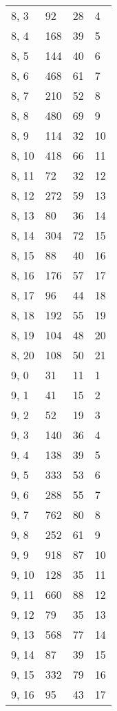 \begin{table}
\begin{tabular}{llll}
8, 3   &      92 &   28 &     4 \\
8, 4   &     168 &   39 &     5 \\
8, 5   &     144 &   40 &     6 \\
8, 6   &     468 &   61 &     7 \\
8, 7   &     210 &   52 &     8 \\
8, 8   &     480 &   69 &     9 \\
8, 9   &     114 &   32 &    10 \\
8, 10  &     418 &   66 &    11 \\
8, 11  &      72 &   32 &    12 \\
8, 12  &     272 &   59 &    13 \\
8, 13  &      80 &   36 &    14 \\
8, 14  &     304 &   72 &    15 \\
8, 15  &      88 &   40 &    16 \\
8, 16  &     176 &   57 &    17 \\
8, 17  &      96 &   44 &    18 \\
8, 18  &     192 &   55 &    19 \\
8, 19  &     104 &   48 &    20 \\
8, 20  &     108 &   50 &    21 \\
9, 0   &      31 &   11 &     1 \\
9, 1   &      41 &   15 &     2 \\
9, 2   &      52 &   19 &     3 \\
9, 3   &     140 &   36 &     4 \\
9, 4   &     138 &   39 &     5 \\
9, 5   &     333 &   53 &     6 \\
9, 6   &     288 &   55 &     7 \\
9, 7   &     762 &   80 &     8 \\
9, 8   &     252 &   61 &     9 \\
9, 9   &     918 &   87 &    10 \\
9, 10  &     128 &   35 &    11 \\
9, 11  &     660 &   88 &    12 \\
9, 12  &      79 &   35 &    13 \\
9, 13  &     568 &   77 &    14 \\
9, 14  &      87 &   39 &    15 \\
9, 15  &     332 &   79 &    16 \\
9, 16  &      95 &   43 &    17 \\

\end{tabular}
\end{table}
